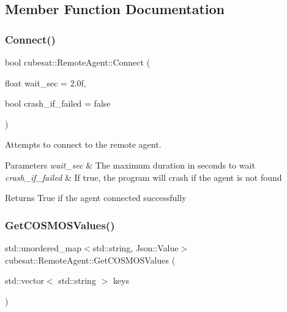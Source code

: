 \subsection{Member Function Documentation}
\mbox{\label{classcubesat_1_1RemoteAgent_a144dbf2aaccbe8cb53f811db1b62cea4}} 
\subsubsection{\texorpdfstring{Connect()}{Connect()}}
{\footnotesize\ttfamily bool cubesat\+::\+Remote\+Agent\+::\+Connect (\begin{DoxyParamCaption}\item[{float}]{wait\+\_\+sec = {\ttfamily 2.0f},  }\item[{bool}]{crash\+\_\+if\+\_\+failed = {\ttfamily false} }\end{DoxyParamCaption})\hspace{0.3cm}{\ttfamily [inline]}}



Attempts to connect to the remote agent. 


\begin{DoxyParams}{Parameters}
{\em wait\+\_\+sec} & The maximum duration in seconds to wait \\
\hline
{\em crash\+\_\+if\+\_\+failed} & If true, the program will crash if the agent is not found \\
\hline
\end{DoxyParams}
\begin{DoxyReturn}{Returns}
True if the agent connected successfully 
\end{DoxyReturn}
\mbox{\label{classcubesat_1_1RemoteAgent_afaaaec695eae602bc2a84d6ad88ed7f6}} 
\subsubsection{\texorpdfstring{Get\+C\+O\+S\+M\+O\+S\+Values()}{GetCOSMOSValues()}}
{\footnotesize\ttfamily std\+::unordered\+\_\+map$<$std\+::string, Json\+::\+Value$>$ cubesat\+::\+Remote\+Agent\+::\+Get\+C\+O\+S\+M\+O\+S\+Values (\begin{DoxyParamCaption}\item[{std\+::vector$<$ std\+::string $>$}]{keys }\end{DoxyParamCaption})\hspace{0.3cm}{\ttfamily [inline]}}



